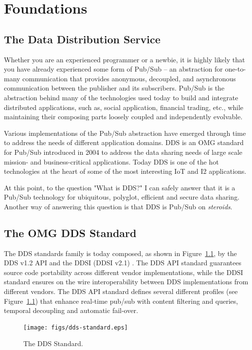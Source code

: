\chapter{Foundations}\label{Chapter:Foundations}
\section{The Data Distribution Service}\label{Section:Intro}
Whether you are an experienced programmer or a newbie, it is highly likely 
that you have already experienced some form of \ac{Pub/Sub} -- 
an abstraction for one-to-many communication that provides anonymous, 
decoupled,  and asynchronous communication between the publisher and 
its subscribers. \ac{Pub/Sub} is the abstraction behind many of the technologies 
used today to build and integrate distributed applications, such as, social 
application,  financial trading, etc., while maintaining their 
composing parts loosely coupled and independently evolvable.

Various implementations of the \ac{Pub/Sub} abstraction have emerged through time to 
address the needs of different application domains. \ac{DDS} is an \ac{OMG} 
standard for \ac{Pub/Sub} introduced in 2004 to address the data sharing needs 
of large scale mission- and business-critical applications. Today \ac{DDS} is 
one of the hot technologies at the heart of some of the most interesting \ac{IoT} and 
\ac{I2} applications.
 
At this point, to the question "What is DDS?" I can safely answer that it is 
a \ac{Pub/Sub} technology for ubiquitous, polyglot, efficient and secure data sharing. 
Another way of answering this question is that \ac{DDS} is \ac{Pub/Sub} on \textit{steroids}.


\section {The OMG DDS Standard}
The \ac{DDS} standards family is today composed, as shown in
Figure~\ref{Figure:DDS:Standard}, by the 
\ac{DDS} v1.2 API \cite{OMG:DDS:04} and the \ac{DDSI} (\ac{DDSI} v2.1) \cite{OMG:DDSI:06}. 
The \ac{DDS} API standard guarantees source code portability across different vendor 
implementations, while the \ac{DDSI} standard ensures on the wire interoperability 
between DDS implementations from different vendors. The \ac{DDS} API standard defines several  different profiles (see Figure~\ref{Figure:DDS:Standard}) that enhance 
real-time pub/sub with content filtering and queries, temporal decoupling and automatic fail-over. 
\begin{figure}[ht]
	\centering
	\texttt{[image: figs/dds-standard.eps]}
	\caption{The \ac{DDS} Standard.}
	\label{Figure:DDS:Standard}
\end{figure}

